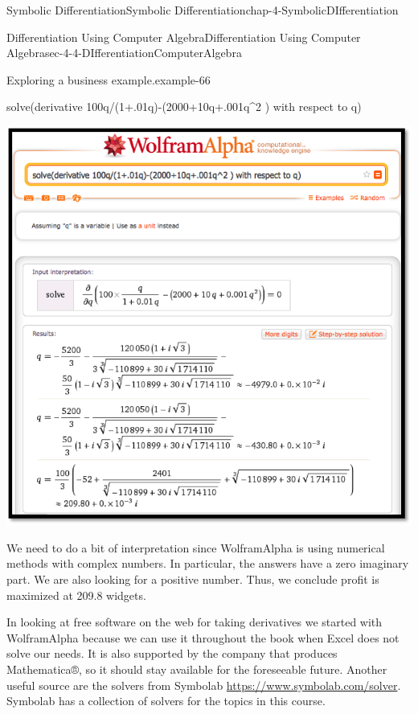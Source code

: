 \documentclass[oneside,10pt,]{book}
\numberwithin{equation}{section}
\begin{document}
\begin{chapterptx}{Symbolic Differentiation}{}{Symbolic Differentiation}{}{}{chap-4-SymbolicDIfferentiation}
\begin{sectionptx}{Differentiation Using Computer Algebra}{}{Differentiation Using Computer Algebra}{}{}{sec-4-4-DIfferentiationComputerAlgebra}
\begin{example}{Exploring a business example.}{example-66}
\par
\hypertarget{p-1733}{}%
solve(derivative 100q\slash{}(1+.01q)-(2000+10q+.001q\textasciicircum{}2 ) with respect to q)%
\begin{sidebyside}{1}{0.1}{0.1}{0}%
\begin{sbspanel}{0.8}%
\includegraphics[width=1\linewidth]{images/sec4-4-7.png}
\end{sbspanel}%
\end{sidebyside}%
\par
\hypertarget{p-1734}{}%
We need to do a bit of interpretation since Wolfram\textbar{}Alpha is using numerical methods with complex numbers.  In particular, the answers have a zero imaginary part.  We are also looking for a positive number.  Thus, we conclude profit is maximized at 209.8 widgets.%
\end{example}
\hypertarget{p-1735}{}%
In looking at free software on the web for taking derivatives we started with Wolfram\textbar{}Alpha because we can use it throughout the book when Excel does not solve our needs.  It is also supported by the company that produces Mathematica®, so it should stay available for the foreseeable future.  Another useful source are the solvers from Symbolab  \href{https://www.symbolab.com/solver}{https:\slash{}\slash{}www.symbolab.com\slash{}solver}. Symbolab has a collection of solvers for the topics in this course.%

\end{sectionptx}
\end{chapterptx}
\end{document}
